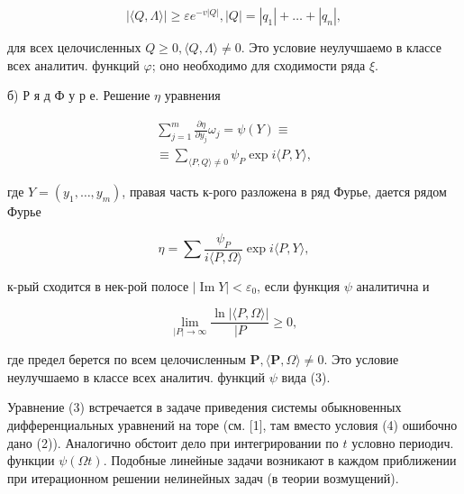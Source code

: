 \documentclass[10pt]{article}
\begin{document}
\[

|\langle Q, \Lambda\rangle| \geqslant \varepsilon e^{-v|Q|},|Q|=\left|q_{1}\right|+\ldots+\left|q_{n}\right|,

\]



для всех целочисленных $Q \geqslant 0,\langle Q, \Lambda\rangle \neq 0$. Это условие неулучшаемо в классе всех аналитич. функций $\varphi$; оно необходимо для сходимости ряда $\xi$.



б) Р я д Ф у р е. Решение $\eta$ уравнения



\[

\begin{gathered}

\sum_{j=1}^{m} \frac{\partial \eta}{\partial y_{j}} \omega_{j}=\psi(Y) \equiv \\

\equiv \sum_{\langle P, Q\rangle \neq 0} \psi_{P} \exp i\langle P, Y\rangle,

\end{gathered}

\]



где $Y=\left(y_{1}, \ldots, y_{m}\right)$, правая часть к-рого разложена в ряд Фурье, дается рядом Фурье



\[

\eta=\sum \frac{\psi_{P}}{i\langle P, \Omega\rangle} \exp i\langle P, Y\rangle,

\]



к-рый сходится в нек-рой полосе $|\operatorname{Im} Y|<\varepsilon_{0}$, если функция $\psi$ аналитична и



\[

\lim _{|P| \rightarrow \infty} \frac{\ln |\langle P, \Omega\rangle|}{\mid P} \geqslant 0,

\]



где предел берется по всем целочисленным $\boldsymbol{P},\langle\boldsymbol{P}, \Omega\rangle \neq 0$. Это условие неулучшаемо в классе всех аналитич. функций $\psi$ вида (3).



Уравнение (3) встречается в задаче приведения системы обыкновенных дифференциальных уравнений на торе (см. [1], там вместо условия (4) ошибочно дано (2)). Аналогично обстоит дело при интегрировании по $t$ условно периодич. функции $\psi(\Omega t)$. Подобные линейные задачи возникают в каждом приближении при итерационном решении нелинейных задач (в теории возмущений).
\end{document}
